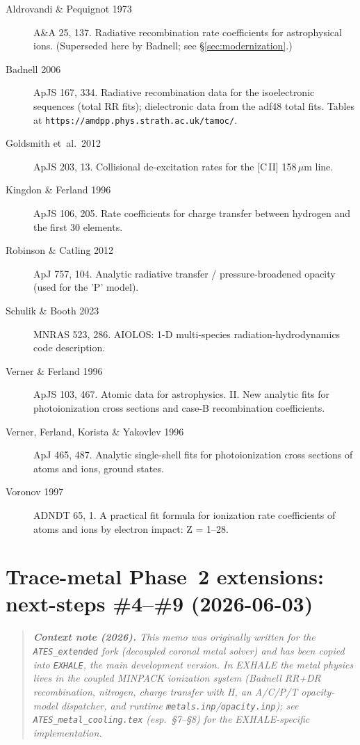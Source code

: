 \documentclass[english,a4paper]{my_memo}
\begin{document}
\begin{description}
  \item[Aldrovandi \& Pequignot 1973] A\&A 25, 137.  Radiative
    recombination rate coefficients for astrophysical ions.
    (Superseded here by Badnell; see \S\ref{sec:modernization}.)
  \item[Badnell 2006] ApJS 167, 334.  Radiative recombination data
    for the isoelectronic sequences (total RR fits); dielectronic data
    from the adf48 total fits.  Tables at
    \texttt{https://amdpp.phys.strath.ac.uk/tamoc/}.
  \item[Goldsmith et~al.~2012] ApJS 203, 13.  Collisional
    de-excitation rates for the [C\,II] 158\,$\mu$m line.
  \item[Kingdon \& Ferland 1996] ApJS 106, 205.  Rate coefficients for
    charge transfer between hydrogen and the first 30 elements.
  \item[Robinson \& Catling 2012] ApJ 757, 104.  Analytic radiative
    transfer / pressure-broadened opacity (used for the 'P' model).
  \item[Schulik \& Booth 2023] MNRAS 523, 286.  AIOLOS:
    1-D multi-species radiation-hydrodynamics code description.
  \item[Verner \& Ferland 1996] ApJS 103, 467.  Atomic data for
    astrophysics. II. New analytic fits for photoionization cross
    sections and case-B recombination coefficients.
  \item[Verner, Ferland, Korista \& Yakovlev 1996] ApJ 465, 487.
    Analytic single-shell fits for photoionization cross sections of
    atoms and ions, ground states.
  \item[Voronov 1997] ADNDT 65, 1.  A practical fit formula for
    ionization rate coefficients of atoms and ions by electron
    impact: Z = 1--28.
\end{description}


\part{Trace-metal Phase~2 extensions: next-steps \#4--\#9 (2026-06-03)}

\begin{quote}\small\itshape
\textbf{Context note (2026).} This memo was originally written for the
\texttt{ATES\_extended} fork (decoupled coronal metal solver) and has
been copied into \texttt{EXHALE}, the main development version. In
EXHALE the metal physics lives in the coupled MINPACK ionization
system (Badnell RR+DR recombination, nitrogen, charge transfer with H,
an A/C/P/T opacity-model dispatcher, and runtime
\texttt{metals.inp}/\texttt{opacity.inp}); see
\texttt{ATES\_metal\_cooling.tex} (esp.\ \S7--\S8) for the
EXHALE-specific implementation.
\end{quote}
\end{document}
